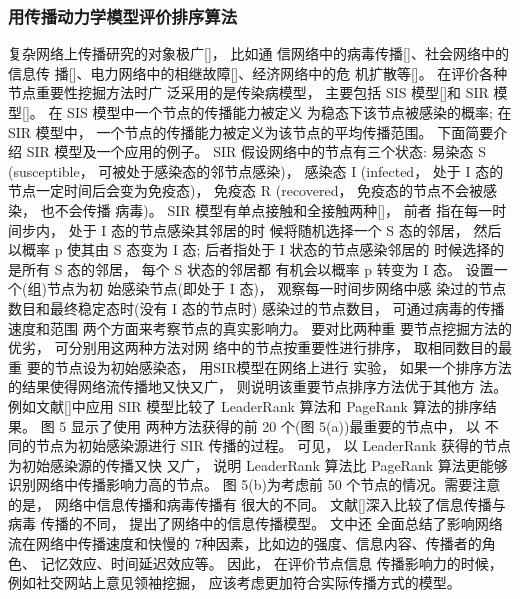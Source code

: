 	\subsubsection{用传播动力学模型评价排序算法}
	复杂网络上传播研究的对象极广[]， 比如通 信网络中的病毒传播[]、社会网络中的信息传 播[]、电力网络中的相继故障[]、经济网络中的危 机扩散等[]。 在评价各种节点重要性挖掘方法时广 泛采用的是传染病模型， 主要包括 SIS 模型[]和 SIR 模型[]。 在 SIS 模型中一个节点的传播能力被定义 为稳态下该节点被感染的概率; 在 SIR 模型中， 一个节点的传播能力被定义为该节点的平均传播范围。
				下面简要介绍 SIR 模型及一个应用的例子。 SIR 假设网络中的节点有三个状态: 易染态 S (susceptible， 可被处于感染态的邻节点感染)， 感染态 I (infected， 处于 I 态的节点一定时间后会变为免疫态)， 免疫态 R (recovered， 免疫态的节点不会被感染， 也不会传播 病毒)。 SIR 模型有单点接触和全接触两种[]， 前者 指在每一时间步内， 处于 I 态的节点感染其邻居的时 候将随机选择一个 S 态的邻居， 然后以概率 p 使其由 S 态变为 I 态; 后者指处于 I 状态的节点感染邻居的 时候选择的是所有 S 态的邻居， 每个 S 状态的邻居都 有机会以概率 p 转变为 I 态。 设置一个(组)节点为初 始感染节点(即处于 I 态)， 观察每一时间步网络中感 染过的节点数目和最终稳定态时(没有 I 态的节点时) 感染过的节点数目， 可通过病毒的传播速度和范围 两个方面来考察节点的真实影响力。 要对比两种重 要节点挖掘方法的优劣， 可分别用这两种方法对网 络中的节点按重要性进行排序， 取相同数目的最重 要的节点设为初始感染态， 用SIR模型在网络上进行 实验， 如果一个排序方法的结果使得网络流传播地又快又广， 则说明该重要节点排序方法优于其他方 法。 例如文献[]中应用 SIR 模型比较了 LeaderRank 算法和 PageRank 算法的排序结果。 图 5 显示了使用 两种方法获得的前 20 个(图 5(a))最重要的节点中， 以 不同的节点为初始感染源进行 SIR 传播的过程。 可见， 以 LeaderRank 获得的节点为初始感染源的传播又快 又广， 说明 LeaderRank 算法比 PageRank 算法更能够 识别网络中传播影响力高的节点。 图 5(b)为考虑前 50 个节点的情况。需要注意的是， 网络中信息传播和病毒传播有 很大的不同。 文献[]深入比较了信息传播与病毒 传播的不同， 提出了网络中的信息传播模型。 文中还 全面总结了影响网络流在网络中传播速度和快慢的 7种因素，比如边的强度、信息内容、传播者的角色、 记忆效应、时间延迟效应等。 因此， 在评价节点信息 传播影响力的时候， 例如社交网站上意见领袖挖掘， 应该考虑更加符合实际传播方式的模型。
			